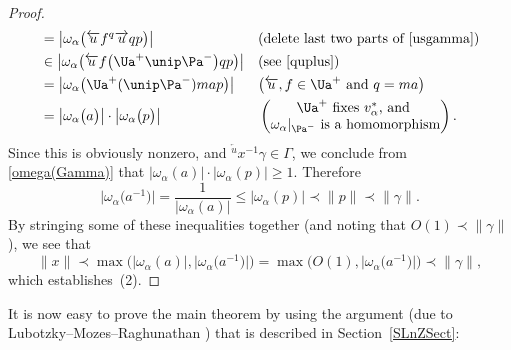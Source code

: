 \begin{proof}
\begin{align*}
	&= \bigl| \omega_\alpha \bigl( \overleftarrow{u} f {}^q \overrightarrow{u} q p \bigr) \bigr|
		&& \text{(delete last two parts of \eqref{usgamma})}
	\\&\in \bigl| \omega_\alpha \bigl( \overleftarrow{u} f \big(\Ua^+ \unip \Pa^-\big) q p \bigr) \bigr|
		&& \text{(see \eqref{quplus})}
	\\&= \bigl| \omega_\alpha \bigl( \Ua^+ (\unip \Pa^-) m a p \bigr) \bigr|
		&& \text{\big($\overleftarrow{u},f \in \Ua^+$ and $q = ma$\big)}
	\\&= \bigl| \omega_\alpha \bigl( a \bigr) \bigr| \cdot \bigl| \omega_\alpha \bigl( p \bigr) \bigr|
		&& \begin{pmatrix} \text{$\Ua^+$ fixes $v_\alpha^*$, and } \\
		\text{$\omega_\alpha|_{\Pa^-}$ is a homomorphism} \end{pmatrix}.
	\end{align*}
Since this is obviously nonzero, and ${}^{\overleftarrow{u}} \! \! x^{-1} \gamma \in \Gamma$, we conclude from \eqref{omega(Gamma)} that $ |\omega_\alpha ( a ) | \cdot |\omega_\alpha ( p ) | \ge 1$. Therefore
	\[ \big|\omega_\alpha\big(a^{-1}\big)\big|
	= \frac{1}{|\omega_\alpha(a)|}
	\le |\omega_\alpha ( p ) |
	\prec \| p\|
	\prec \| \gamma\| .\]
By stringing some of these inequalities together (and noting that $O(1) \prec \| \gamma\|$), we see that
	\[ \| x\|
	 \prec \max \bigl( |\omega_\alpha(a)|, \big|\omega_\alpha\big(a^{-1}\big)\big| \bigr)
	 = \max \bigl( O(1), \big|\omega_\alpha\big(a^{-1}\big)\big| \bigr)
	 \prec \| \gamma\|
	 , \]
which establishes~(2).
\end{proof}

It is now easy to prove the main theorem by using the argument (due to Lubotzky--Mozes--Raghunathan \cite[Section~4]{MR1828742}) that is described in Section~\ref{SLnZSect}:

